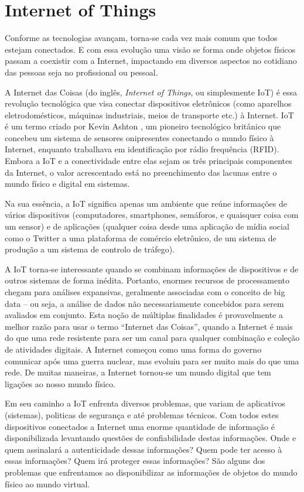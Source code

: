 \section{Internet of Things}
\label{sec:iot}

Conforme as tecnologias avançam, torna-se cada vez mais comum que todos estejam conectados. E com essa evolução uma visão se forma onde objetos físicos passam a coexistir com a Internet, impactando em diversos aspectos no cotidiano das pessoas seja no profissional ou pessoal.

A Internet das Coisas (do inglês, \textit{Internet of Things}, ou simplesmente IoT) é essa revolução tecnológica que visa conectar dispositivos eletrônicos (como aparelhos eletrodomésticos, máquinas industriais, meios de transporte etc.) à Internet. IoT é um termo criado por Kevin Ashton \cite{Kevin}, um pioneiro tecnológico britânico que concebeu um sistema de sensores onipresentes conectando o mundo físico à Internet, enquanto trabalhava em identificação por rádio frequência (RFID). Embora a IoT e a conectividade entre elas sejam os três principais componentes da Internet, o valor acrescentado está no preenchimento das lacunas entre o mundo físico e digital em sistemas.

Na sua essência, a IoT significa apenas um ambiente que reúne informações de vários dispositivos (computadores, smartphones, semáforos, e quaisquer coisa com um sensor) e de aplicações (qualquer coisa desde uma aplicação de mídia social como o Twitter a uma plataforma de comércio eletrônico, de um sistema de produção a um sistema de controlo de tráfego).

A IoT torna-se interessante quando se combinam informações de dispositivos e de outros sistemas de forma inédita. Portanto, enormes recursos de processamento chegam para análises expansivas, geralmente associadas com o conceito de big data – ou seja, a análise de dados não necessariamente concebidos para serem avaliados em conjunto. Esta noção de múltiplas finalidades é provavelmente a melhor razão para usar o termo “Internet das Coisas”, quando a Internet é mais do que uma rede resistente para ser um canal para qualquer combinação e coleção de atividades digitais. A Internet começou como uma forma do governo comunicar após uma guerra nuclear, mas evoluiu para ser muito mais do que uma rede. De muitas maneiras, a Internet tornou-se um mundo digital que tem ligações ao nosso mundo físico.

Em seu caminho a IoT enfrenta diversos problemas, que variam de aplicativos (sistemas), politicas de segurança e até problemas técnicos. Com todos estes dispositivos conectados a Internet uma enorme quantidade de informação é disponibilizada levantando questões de confiabilidade destas informações. Onde e quem assinalará a autenticidade dessas informações? Quem pode ter acesso à essas informações? Quem irá proteger essas informações? São alguns dos problemas que enfrentamos ao disponibilizar as informações de objetos do mundo físico ao mundo virtual.

